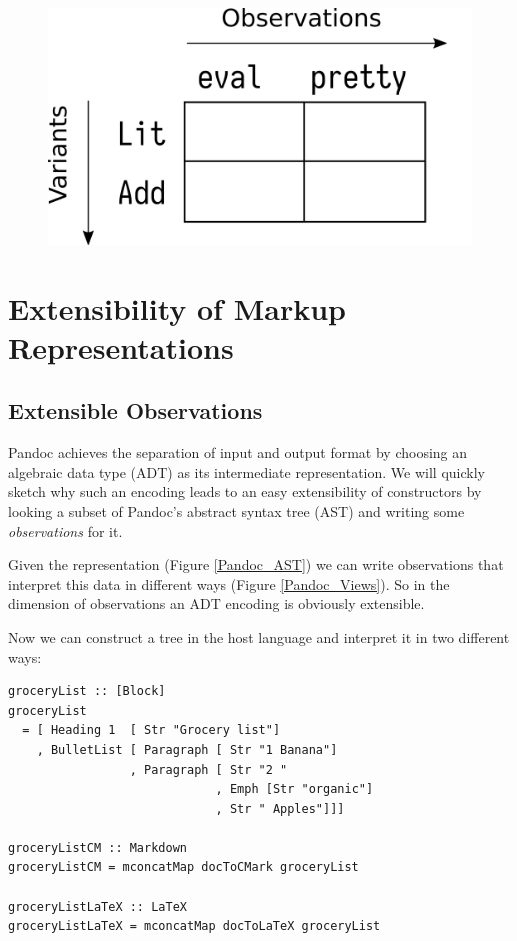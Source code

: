 \vspace*{\fill}
\begin{figure}
    \centering
    \includegraphics{resources/expression_problem_dimensions.png}
\end{figure}
\vspace*{\fill}
\clearpage

\section{Extensibility of Markup Representations}
\label{main_section}
\subsection{Extensible Observations}

Pandoc achieves the separation of input and output format by choosing an
algebraic data type (ADT) as its intermediate representation. We will quickly
sketch why such an encoding leads to an easy extensibility of constructors by
looking a subset of Pandoc's abstract syntax tree (AST) and writing some
\emph{observations} for it.

Given the representation (Figure \ref{Pandoc_AST}) we can write observations that
interpret this data in different ways (Figure \ref{Pandoc_Views}). So in the
dimension of observations an ADT encoding is obviously extensible.

Now we can construct a tree in the host language and interpret it in two
different ways:
\begin{lstlisting}
groceryList :: [Block]
groceryList
  = [ Heading 1  [ Str "Grocery list"]
    , BulletList [ Paragraph [ Str "1 Banana"]
                 , Paragraph [ Str "2 "
                             , Emph [Str "organic"]
                             , Str " Apples"]]]

groceryListCM :: Markdown
groceryListCM = mconcatMap docToCMark groceryList

groceryListLaTeX :: LaTeX
groceryListLaTeX = mconcatMap docToLaTeX groceryList
\end{lstlisting}

